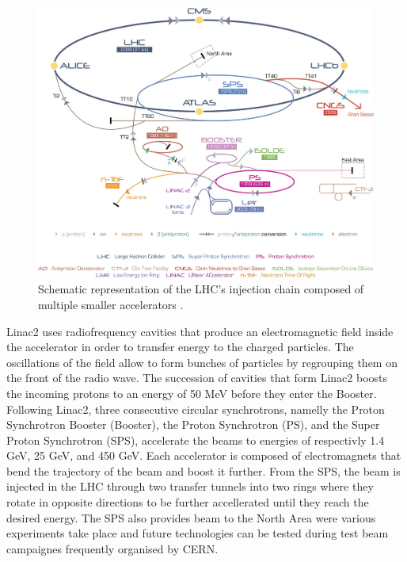 		\begin{figure}[h!]
			\centering
			\includegraphics[width=\textwidth]{img/I-2-LHC/injectors.png}
			\caption{Schematic representation of the LHC's injection chain composed of multiple smaller accelerators \Cite{TE-EPC-LPC}.}
			\label{fig:I-2-injection-chain}
		\end{figure}

    Linac2 uses radiofrequency cavities that produce an electromagnetic field inside the accelerator in order to transfer energy to the charged particles. The oscillations of the field allow to form bunches of particles by regrouping them on the front of the radio wave. The succession of cavities that form Linac2 boosts the incoming protons to an energy of 50 MeV before they enter the Booster. \\

    Following Linac2, three consecutive circular synchrotrons, namelly the Proton Synchrotron Booster (Booster), the Proton Synchrotron (PS), and the Super Proton Synchrotron (SPS), accelerate the beams to energies of respectivly 1.4 GeV, 25 GeV, and 450 GeV. Each accelerator is composed of electromagnets that bend the trajectory of the beam and boost it further. From the SPS, the beam is injected in the LHC through two transfer tunnels into two rings where they rotate in opposite directions to be further accellerated until they reach the desired energy. The SPS also provides beam to the North Area were various experiments take place and future technologies can be tested during test beam campaignes frequently organised by CERN.


